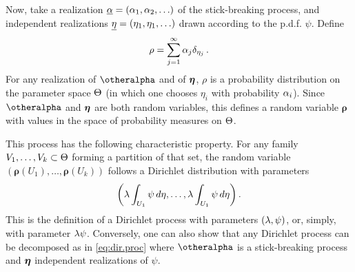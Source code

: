 Now, take a realization ${\underline{\alpha}} = (\alpha_1, \alpha_2, \ldots)$ of the stick-breaking process, and independent realizations ${\underline{\eta}} = (\eta_1,  \eta_1, \ldots)$ drawn according to the p.d.f. $\psi$. Define
\begin{equation}
\label{eq:dir.proc}
\rho = \sum_{j=1}^\infty \alpha_j \delta_{\eta_j}\,.
\end{equation}
For any realization of $\bfal$ and of ${\bm{\eta}}$, $\rho$ is a probability distribution on the parameter space $\Theta$ (in which one chooses $\eta_i$ with probability $\alpha_i$). Since $\bfal$ and ${\bm{\eta}}$ are both random variables, this defines a random variable $\boldsymbol\rho$  with values in the space of probability measures on $\Theta$.


This process has the following characteristic property. For any family $V_1, \ldots, V_k\subset \Theta$ forming a partition of that set,  the random variable $(\boldsymbol\rho(U_1), \ldots, \boldsymbol\rho(U_k))$  follows a Dirichlet distribution with parameters 
\[
\left(\lambda \int_{U_1} \psi\,d\eta , \ldots, \lambda \int_{U_1} \psi\,d\eta \right).
\] 
This is the definition of  a Dirichlet process with parameters $(\lambda, \psi)$, or, simply, with parameter $\lambda\psi$. Conversely, one can also show that any Dirichlet process can be decomposed as in \cref{eq:dir.proc} where $\bfal$ is a stick-breaking process and ${\bm{\eta}}$ independent realizations of $\psi$.



